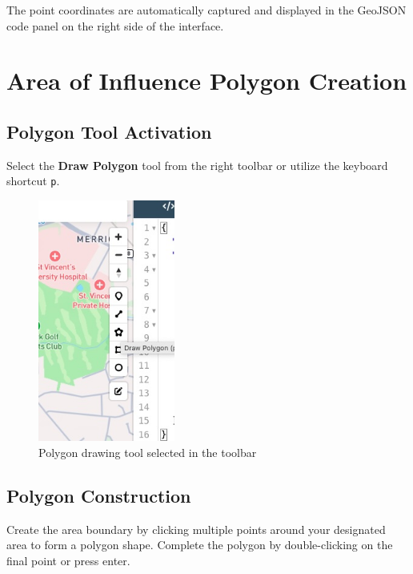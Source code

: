 \documentclass[11pt,a4paper]{article}
\begin{document}
The point coordinates are automatically captured and displayed in the GeoJSON code panel on the right side of the interface.

\section{Area of Influence Polygon Creation}

\subsection{Polygon Tool Activation}

Select the \textbf{Draw Polygon} tool from the right toolbar or utilize the keyboard shortcut \texttt{p}.

\begin{figure}[H]
    \centering
    \includegraphics[width=0.4\textwidth]{img/step3_1.jpg}
    \caption{Polygon drawing tool selected in the toolbar}
    \label{fig:step3_1}
\end{figure}

\subsection{Polygon Construction}

Create the area boundary by clicking multiple points around your designated area to form a polygon shape. Complete the polygon by double-clicking on the final point or press enter.
\end{document}
